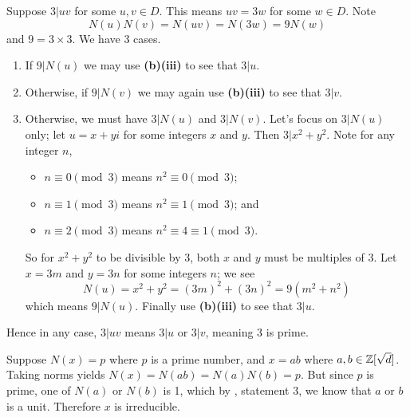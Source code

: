 \begin{questions}
\begin{partquestions}{\alph*}
\begin{partquestions}{\roman*}
            \item Suppose $3 \vert uv$ for some $u,v\in D$. This means $uv = 3w$ for some $w \in D$. Note
            \[
                N(u)N(v) = N(uv) = N(3w) = 9N(w)
            \]
            and $9 = 3\times3$. We have 3 cases.
            \begin{enumerate}[label=\arabic*.]
                \item If $9 \vert N(u)$ we may use \textbf{(b)(iii)} to see that $3 \vert u$.
                \item Otherwise, if $9 \vert N(v)$ we may again use \textbf{(b)(iii)} to see that $3 \vert v$.
                \item Otherwise, we must have $3 \vert N(u)$ and $3 \vert N(v)$. Let's focus on $3 \vert N(u)$ only; let $u = x+yi$ for some integers $x$ and $y$. Then $3 \vert x^2+y^2$. Note for any integer $n$,
                \begin{itemize}
                    \item $n \equiv 0 \pmod3$ means $n^2 \equiv 0 \pmod3$;
                    \item $n \equiv 1 \pmod3$ means $n^2 \equiv 1 \pmod3$; and
                    \item $n \equiv 2 \pmod3$ means $n^2 \equiv 4 \equiv 1 \pmod3$.
                \end{itemize}
                So for $x^2+y^2$ to be divisible by 3, both $x$ and $y$ must be multiples of 3. Let $x = 3m$ and $y = 3n$ for some integers $n$; we see
                \[
                    N(u) = x^2+y^2 = (3m)^2 + (3n)^2 = 9(m^2+n^2)
                \]
                which means $9 \vert N(u)$. Finally use \textbf{(b)(iii)} to see that $3 \vert u$.
            \end{enumerate}
            Hence in any case, $3 \vert uv$ means $3 \vert u$ or $3 \vert v$, meaning 3 is prime.
        \end{partquestions}
    \end{partquestions}

    \item Suppose $N(x) = p$ where $p$ is a prime number, and $x = ab$ where $a,b \in \mathbb{Z}[\sqrt{d}]$. Taking norms yields $N(x) = N(ab) = N(a)N(b) = p$. But since $p$ is prime, one of $N(a)$ or $N(b)$ is 1, which by , statement 3, we know that $a$ or $b$ is a unit. Therefore $x$ is irreducible.
    

\end{questions}

